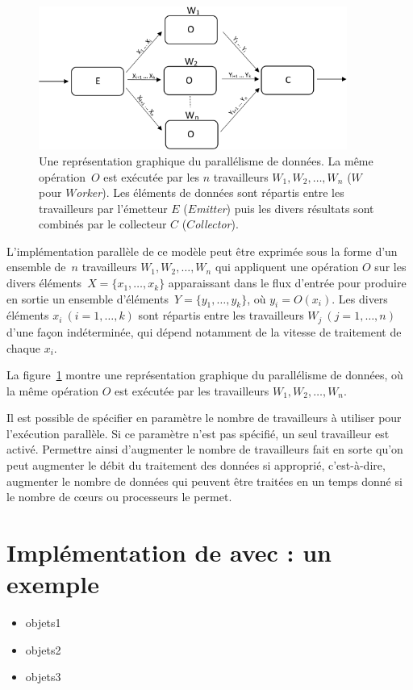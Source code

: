 \begin{figure}

\centering
     \includegraphics[width=0.9\textwidth]{Figures/DataParallelisme.png}
      \caption[Une repr\'esentation graphique du parall\'elisme de donn\'ees en \ppff.]{Une repr\'esentation graphique du parall\'elisme de donn\'ees. La m\^eme op\'eration~$O$ est ex\'ecut\'ee par les $n$ travailleurs $W_1, W_2,\ldots, W_n$ ($W$ pour \emph{$W$orker}). Les \'el\'ements de donn\'ees sont r\'epartis entre les travailleurs par l'\'emetteur $E$ ($E$\emph{mitter}) puis les divers r\'esultats sont combin\'es par le collecteur $C$ ($C$\emph{ollector}).}
       \label{DataParallelisme.fig}
\end{figure}


L'impl\'ementation parall\`ele de ce mod\`ele peut \^etre
exprim\'ee sous la forme d'un ensemble de~$n$ travailleurs $W_1, W_2,\ldots, W_n$ qui
appliquent une op\'eration $O$ sur les divers \'el\'ements~$X = \{x_1, \ldots, x_k\}$ apparaissant dans
le flux d'entr\'ee pour produire en sortie un ensemble d'\'el\'ements~$Y = \{y_1, \ldots, y_k\}$, o\`u $y_i = O(x_i)$.
%
Les divers \'el\'ements $x_i~(i=1, \ldots, k)$ sont r\'epartis entre
les travailleurs $W_j~(j=1, \ldots, n)$ d'une fa\c{c}on
ind\'etermin\'ee, qui d\'epend notamment de la vitesse de traitement
de chaque $x_i$.
%

La figure~\ref{DataParallelisme.fig} montre une repr\'esentation graphique du parall\'elisme de donn\'ees, o\`u la m\^eme op\'eration $O$ est ex\'ecut\'ee par les travailleurs $W_1, W_2,\ldots, W_n$. 

Il est possible de sp\'ecifier en param\`etre le nombre de travailleurs \`a utiliser pour l'ex\'ecution parall\`ele. Si ce param\`etre n'est pas sp\'ecifi\'e, un seul travailleur est activ\'e. Permettre ainsi d'augmenter le nombre de travailleurs fait en sorte qu'on peut augmenter le d\'ebit du traitement des donn\'ees si appropri\'e, c'est-\`a-dire, augmenter le nombre de donn\'ees qui peuvent \^etre trait\'ees en un temps donn\'e si le nombre de c\oe{}urs ou processeurs le permet.




\section{Impl\'ementation de  avec  : un exemple}


\begin{itemize}

\item objets1 

\item objets2 

\item objets3 


\end{itemize}
